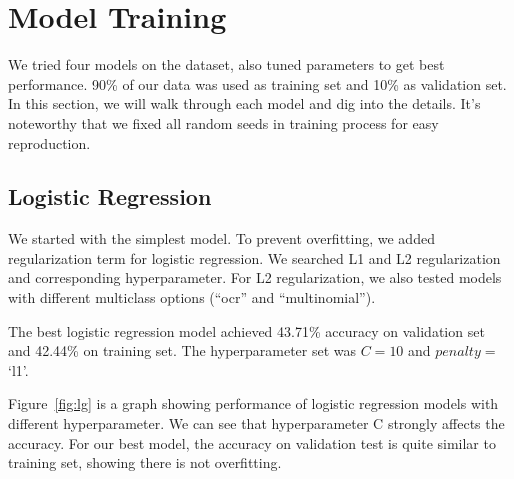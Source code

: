 \documentclass[a4paper, 11pt]{article}
\begin{document}
\section*{Model Training}
We tried four models on the dataset, also tuned parameters to get best performance. 90\% of our data was used as training set and 10\% as validation set. In this section, we will walk through each model and dig into the details. It's noteworthy that we fixed all random seeds in training process for easy reproduction.
\subsection*{Logistic Regression}
We started with the simplest model. To prevent overfitting, we added regularization term for logistic regression. We searched L1 and L2 regularization and corresponding hyperparameter. For L2 regularization, we also tested models with different multiclass options (``ocr'' and ``multinomial'').

The best logistic regression model achieved 43.71\% accuracy on validation set and 42.44\% on training set. The hyperparameter set was $C = 10$ and $penalty=$`l1'.

Figure~\ref{fig:lg} is a graph showing performance of logistic regression models with different hyperparameter. We can see that hyperparameter C strongly affects the accuracy. For our best model, the accuracy on validation test is quite similar to training set, showing there is not overfitting.
\end{document}
